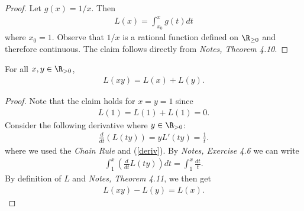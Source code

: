 \documentclass{article}
\begin{document}
\begin{proof}
   Let $g(x) = 1/x$. Then 
   \begin{align*}
      L(x) = \int_{x_0}^x g(t) dt
   \end{align*}
   where $x_0=1$. Observe that $1/x$ is a rational function defined on $\R_{\geq 0}$
   and therefore continuous. The claim follows directly from \emph{Notes, Theorem 4.10}.
\end{proof}

\begin{claim*}
   For all $x,y\in\R_{>0}$,
   \begin{align*}
      L(xy) = L(x) + L(y).
   \end{align*}
\end{claim*}

\begin{proof}
   Note that the claim holds for $x=y=1$ since 
   \begin{align*}
      L(1) = L(1) + L(1) = 0.
   \end{align*}
   Consider the following derivative where $y\in\R_{>0}$:
   \begin{align*}
      \frac{d}{dt}\left(L(ty)\right) = yL'(ty) = \frac{1}{t}.
   \end{align*}
   where we used the \emph{Chain Rule} and (\ref{deriv}). By \emph{Notes, Exercise 4.6}
   we can write
   \begin{align*}
      \int_1^x \left(\frac{d}{dt}L(ty)\right)dt = \int_1^x \frac{dt}{t}.
   \end{align*}
   By definition of $L$ and \emph{Notes, Theorem 4.11}, we then get
   \begin{align*}
      L(xy) - L(y) = L(x).
   \end{align*}
\end{proof}
\end{document}
